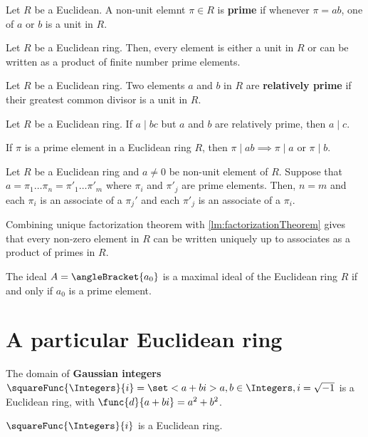 \begin{definition}
    Let \(R\) be a Euclidean. A non-unit elemnt \(\pi \in R\) is \textbf{prime} if whenever \(\pi = ab\), one of \(a\) or \(b\) is a unit in \(R\).
\end{definition}

\begin{theorem}\label{lm:factorizationTheorem}
    Let \(R\) be a Euclidean ring. Then, every element is either a unit in \(R\) or can be written as a product of finite number prime elements.
\end{theorem}

\begin{definition}
    Let \(R\) be a Euclidean ring. Two elements \(a\) and \(b\) in \(R\) are \textbf{relatively prime} if their greatest common divisor is a unit in \(R\).
\end{definition}

\begin{lemma}
    Let \(R\) be a Euclidean ring. If \(a \mid bc\) but \(a\) and \(b\) are relatively prime, then \(a \mid c\).
\end{lemma}

\begin{lemma}
    If \(\pi\) is a prime element in a Euclidean ring \(R\), then \(\pi \mid ab \implies \pi \mid a\) or \(\pi \mid b\).
\end{lemma}

\begin{theorem}
    Let \(R\) be a Euclidean ring and \(a \neq 0\) be non-unit element of \(R\). Suppose that \(a = \pi_1 \dots \pi_n = \pi'_1 \dots \pi'_m\) where \(\pi_i\) and \(\pi'_j\) are prime elements. Then, \(n = m\) and each \(\pi_i\) is an associate of a \(\pi_j'\) and each \(\pi'_j\) is an associate of a \(\pi_i\).
\end{theorem}

Combining unique factorization theorem with \ref{lm:factorizationTheorem} gives that every non-zero element in \(R\) can be written uniquely up to associates as a product of primes in \(R\).

\begin{lemma}
    The ideal \(A = \angleBracket{a_0}\) is a maximal ideal of the Euclidean ring \(R\) if and only if \(a_0\) is a prime element.
\end{lemma}

\section{A particular Euclidean ring}
The domain of \textbf{Gaussian integers} \(\squareFunc{\Integers}{i} = \set<a + bi>{a,b \in \Integers, i = \sqrt{-1}}\) is a Euclidean ring, with \(\func{d}{a + bi} = a^2 + b^2\).
\begin{theorem}
    \(\squareFunc{\Integers}{i}\) is a Euclidean ring.
\end{theorem}

